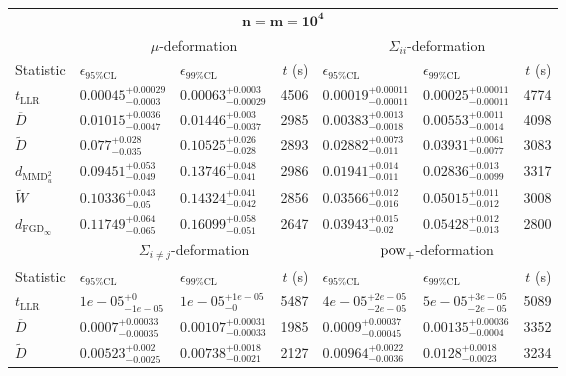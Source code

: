 \begin{tabular}{l|llr|llr}
	\toprule
	\multicolumn{7}{c}{$\mathbf{n=m=10^{4}}$} \\
	\multicolumn{1}{c}{} & \multicolumn{3}{c}{$\mu$-deformation} & \multicolumn{3}{c}{$\Sigma_{ii}$-deformation} \\
	Statistic & $\epsilon_{95\%\mathrm{CL}}$ & $\epsilon_{99\%\mathrm{CL}}$ & $t$ (s) & $\epsilon_{95\%\mathrm{CL}}$ & $\epsilon_{99\%\mathrm{CL}}$ & $t$ (s) \\
	\midrule
	$t_{\mathrm{LLR}}$ & $0.00045_{-0.0003}^{+0.00029}$ & $0.00063_{-0.00029}^{+0.0003}$ & 4506 & $0.00019_{-0.00011}^{+0.00011}$ & $0.00025_{-0.00011}^{+0.00011}$ & 4774 \\
	$\overline{D}$ & $0.01015_{-0.0047}^{+0.0036}$ & $0.01446_{-0.0037}^{+0.003}$ & 2985 & $0.00383_{-0.0018}^{+0.0013}$ & $0.00553_{-0.0014}^{+0.0011}$ & 4098 \\
	$\widetilde{D}$ & $0.077_{-0.035}^{+0.028}$ & $0.10525_{-0.028}^{+0.026}$ & 2893 & $0.02882_{-0.011}^{+0.0073}$ & $0.03931_{-0.0077}^{+0.0061}$ & 3083 \\
	$d_{\mathrm{MMD}^{2}_{u}}$ & $0.09451_{-0.049}^{+0.053}$ & $0.13746_{-0.041}^{+0.048}$ & 2986 & $0.01941_{-0.011}^{+0.014}$ & $0.02836_{-0.0099}^{+0.013}$ & 3317 \\
	$\widetilde{W}$ & $0.10336_{-0.05}^{+0.043}$ & $0.14324_{-0.042}^{+0.041}$ & 2856 & $0.03566_{-0.016}^{+0.012}$ & $0.05015_{-0.012}^{+0.011}$ & 3008 \\
	$d_{\mathrm{FGD}_{\infty}}$ & $0.11749_{-0.065}^{+0.064}$ & $0.16099_{-0.051}^{+0.058}$ & 2647 & $0.03943_{-0.02}^{+0.015}$ & $0.05428_{-0.013}^{+0.012}$ & 2800 \\
	\toprule
	\multicolumn{1}{c}{} & \multicolumn{3}{c}{$\Sigma_{i\neq j}$-deformation} & \multicolumn{3}{c}{$\rm{pow}_{+}$-deformation} \\
	Statistic & $\epsilon_{95\%\mathrm{CL}}$ & $\epsilon_{99\%\mathrm{CL}}$ & $t$ (s) & $\epsilon_{95\%\mathrm{CL}}$ & $\epsilon_{99\%\mathrm{CL}}$ & $t$ (s) \\
	\midrule
	$t_{\mathrm{LLR}}$ & $1e-05_{-1e-05}^{+0}$ & $1e-05_{-0}^{+1e-05}$ & 5487 & $4e-05_{-2e-05}^{+2e-05}$ & $5e-05_{-2e-05}^{+3e-05}$ & 5089 \\
	$\overline{D}$ & $0.0007_{-0.00035}^{+0.00033}$ & $0.00107_{-0.00033}^{+0.00031}$ & 1985 & $0.0009_{-0.00045}^{+0.00037}$ & $0.00135_{-0.0004}^{+0.00036}$ & 3352 \\
	$\widetilde{D}$ & $0.00523_{-0.0025}^{+0.002}$ & $0.00738_{-0.0021}^{+0.0018}$ & 2127 & $0.00964_{-0.0036}^{+0.0022}$ & $0.0128_{-0.0023}^{+0.0018}$ & 3234 \\

\end{tabular}
